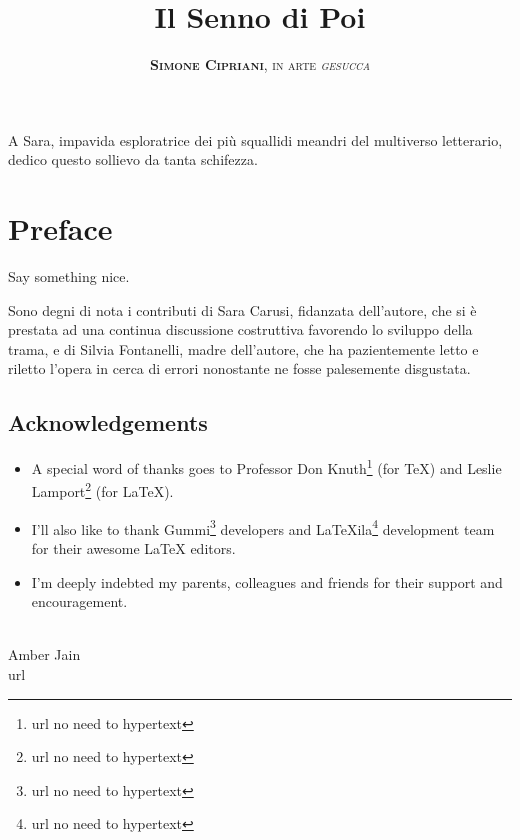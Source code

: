 \documentclass[11pt]{book}
\title{
	\Huge \textbf{Il Senno di Poi}
}
\author{
	\textsc{\textbf{Simone Cipriani}, in arte \textit{gesucca}}
}
\newenvironment{dedication} {
	\cleardoublepage\thispagestyle{empty}
	\vspace*{\stretch{1}}
	\hfill\begin{minipage}[t]{0.66\textwidth}
	\raggedright}
{
	\end{minipage}
	\vspace*{\stretch{3}}
	\clearpage
}
\begin{document}
\frontmatter
\maketitle
\begin{dedication}
	A Sara, impavida esploratrice dei più squallidi meandri del multiverso letterario, dedico questo sollievo da tanta schifezza.
\end{dedication}

\mainmatter\chapter*{Preface}

Say something nice.

Sono degni di nota i contributi di Sara Carusi, fidanzata dell'autore, che si è prestata ad una continua discussione costruttiva favorendo lo sviluppo della trama, e di Silvia Fontanelli, madre dell'autore, che ha pazientemente letto e riletto l'opera in cerca di errori nonostante ne fosse palesemente disgustata.

\section*{Acknowledgements}
\begin{itemize}
	\item A special word of thanks goes to Professor Don Knuth\footnote{url no need to hypertext} (for \TeX{}) and Leslie Lamport\footnote{url no need to hypertext} (for \LaTeX{}).
	\item I'll also like to thank Gummi\footnote{url no need to hypertext} developers and LaTeXila\footnote{url no need to hypertext} development team for their awesome \LaTeX{} editors.
	\item I'm deeply indebted my parents, colleagues and friends for their support and encouragement.
\end{itemize}
\mbox{} \\
\noindent Amber Jain \\
\noindent url












\end{document}

